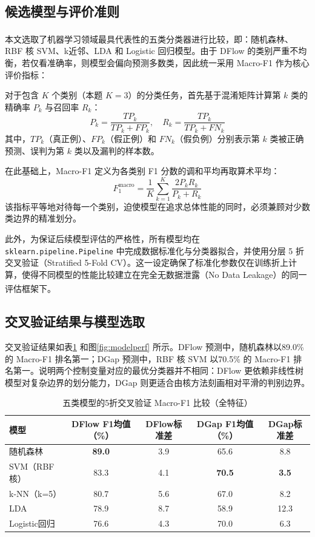 \documentclass[UTF8,a4paper,12pt]{ctexart}
\newcommand{\upcite}[1]{\textsuperscript{\cite{#1}}}
\begin{document}
\subsection{候选模型与评价准则}

本文选取了机器学习领域\upcite{ref2}最具代表性的五类分类器进行比较，即：随机森林、RBF 核 SVM、k近邻、LDA 和 Logistic 回归模型。由于 DFlow 的类别严重不均衡，若仅看准确率，则模型会偏向预测多数类，因此统一采用 Macro-F1 作为核心评价指标：

对于包含 $K$ 个类别（本题 $K=3$）的分类任务，首先基于混淆矩阵计算第 $k$ 类的精确率 $P_k$ 与召回率 $R_k$：
\begin{equation}
    P_k = \frac{TP_k}{TP_k + FP_k}, \quad R_k = \frac{TP_k}{TP_k + FN_k}
\end{equation}
其中，$TP_k$（真正例）、$FP_k$（假正例）和 $FN_k$（假负例）分别表示第 $k$ 类被正确预测、误判为第 $k$ 类以及漏判的样本数。

在此基础上，Macro-F1 定义为各类别 F1 分数的调和平均再取算术平均：
\begin{equation}
    F_1^{\text{macro}} = \frac{1}{K} \sum_{k=1}^{K} \frac{2 P_k R_k}{P_k + R_k}
\end{equation}
该指标平等地对待每一个类别，迫使模型在追求总体性能的同时，必须兼顾对少数类边界的精准划分。

此外，为保证后续模型评估的严格性，所有模型均在 \texttt{sklearn.pipeline.Pipeline} 中完成数据标准化与分类器拟合，并使用分层 5 折交叉验证（Stratified 5-Fold CV）。这一设定确保了标准化参数仅在训练折上计算，使得不同模型的性能比较建立在完全无数据泄露（No Data Leakage）的同一评估框架下\upcite{ref10}。

\subsection{交叉验证结果与模型选取}

交叉验证结果如表\ref{tab:cv} 和图\ref{fig:modelperf} 所示。DFlow 预测中，随机森林以89.0\% 的 Macro-F1 排名第一；DGap 预测中，RBF 核 SVM 以70.5\% 的 Macro-F1 排名第一。说明两个控制变量对应的最优分类器并不相同：DFlow 更依赖非线性树模型对复杂边界的划分能力，DGap 则更适合由核方法刻画相对平滑的判别边界。

\begin{table}[H]
\centering
\caption{五类模型的5折交叉验证 Macro-F1 比较（全特征）}
\label{tab:cv}
\begin{tabular}{lcccc}
\toprule
模型 & DFlow F1均值（\%） & DFlow标准差 & DGap F1均值（\%） & DGap标准差 \\
\midrule
随机森林 & \textbf{89.0} & 3.9 & 65.6 & 8.8 \\
SVM（RBF核） & 83.3 & 4.1 & \textbf{70.5} & \textbf{3.5} \\
k-NN（k=5） & 80.7 & 5.6 & 67.0 & 8.2 \\
LDA & 78.9 & 8.7 & 58.9 & 12.3 \\
Logistic回归 & 76.6 & 4.3 & 70.0 & 6.3 \\
\bottomrule
\end{tabular}
\end{table}
\end{document}
